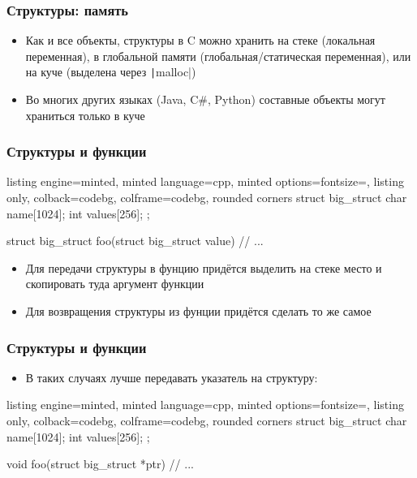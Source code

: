 \documentclass[10pt]{beamer}
\begin{document}
\begin{frame}[fragile]
\frametitle{Структуры: память}
\begin{itemize}
\item Как и все объекты, структуры в C можно хранить на стеке (локальная переменная), в глобальной памяти (глобальная/статическая переменная), или на куче (выделена через \texttt|malloc|)
\pause
\item Во многих других языках (Java, C\#, Python) составные объекты могут храниться только в куче
\end{itemize}
\end{frame}

\begin{frame}[fragile]
\frametitle{Структуры и функции}
\begin{tcblisting}{listing engine=minted, minted language=cpp, minted options={fontsize=\scriptsize}, listing only, colback=codebg, colframe=codebg, rounded corners}
struct big_struct {
  char name[1024];
  int values[256];
};

struct big_struct foo(struct big_struct value) {
  // ...
}
\end{tcblisting}
\pause
\begin{itemize}
\item Для передачи структуры в фунцию придётся выделить на стеке место и скопировать туда аргумент функции
\pause
\item Для возвращения структуры из фунции придётся сделать то же самое
\end{itemize}
\end{frame}

\begin{frame}[fragile]
\frametitle{Структуры и функции}
\begin{itemize}
\item В таких случаях лучше передавать указатель на структуру:
\end{itemize}
\begin{tcblisting}{listing engine=minted, minted language=cpp, minted options={fontsize=\scriptsize}, listing only, colback=codebg, colframe=codebg, rounded corners}
struct big_struct {
  char name[1024];
  int values[256];
};

void foo(struct big_struct *ptr) {
  // ...
}
\end{tcblisting}
\end{frame}
\end{document}
